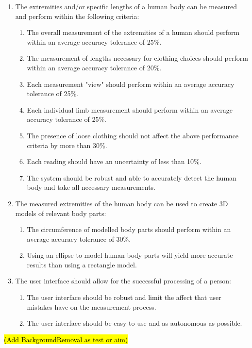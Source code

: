 \begin{enumerate}
	\item The extremities and/or specific lengths of a human body can be measured and perform within the following criteria:
	\begin{enumerate}
		\item The overall measurement of the extremities of a human should perform within an average accuracy tolerance of 25\%.
		\item The measurement of lengths necessary for clothing choices should perform within an average accuracy tolerance of 20\%.
		\item Each measurement "view" should perform within an average accuracy tolerance of 25\%.
		\item Each individual limb measurement should perform within an average accuracy tolerance of 25\%.
		\item The presence of loose clothing should not affect the above performance criteria by more than 30\%.
		\item Each reading should have an uncertainty of less than 10\%.
		\item The system should be robust and able to accurately detect the human body and take all necessary measurements. 
	\end{enumerate}
	\item The measured extremities of the human body can be used to create 3D models of relevant body parts: 
	\begin{enumerate}
		\item The circumference of modelled body parts should perform within an average accuracy tolerance of 30\%.
		\item Using an ellipse to model human body parts will yield more accurate results than using a rectangle model. 
	\end{enumerate}
	\item The user interface should allow for the successful processing of a person: 
	\begin{enumerate}
		\item The user interface should be robust and limit the affect that user mistakes have on the measurement process.
		\item The user interface should be easy to use and as autonomous as possible.
	\end{enumerate}
\end{enumerate}

\hl{(Add BackgroundRemoval as test or aim)}
